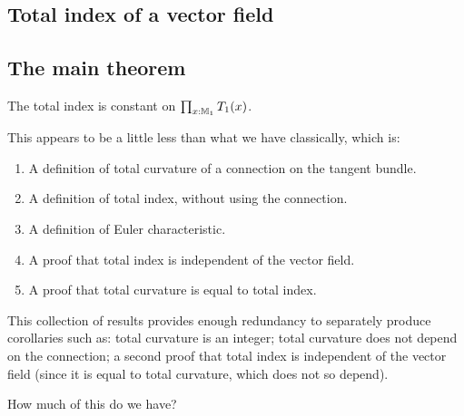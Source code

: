 \subsection{Total index of a vector field}


\subsection{The main theorem}
\begin{mythm}
The total index is constant on \( \prod_{x:\mathbb{M}_1}T_1(x) \).
\end{mythm}

This appears to be a little less than what we have classically, which is:
\begin{enumerate}
\item A definition of total curvature of a connection on the tangent bundle.
\item A definition of total index, without using the connection.
\item A definition of Euler characteristic.
\item A proof that total index is independent of the vector field.
\item A proof that total curvature is equal to total index.
\end{enumerate}
This collection of results provides enough redundancy to separately produce corollaries such as: total curvature is an integer; total curvature does not depend on the connection; a second proof that total index is independent of the vector field (since it is equal to total curvature, which does not so depend).

How much of this do we have?
